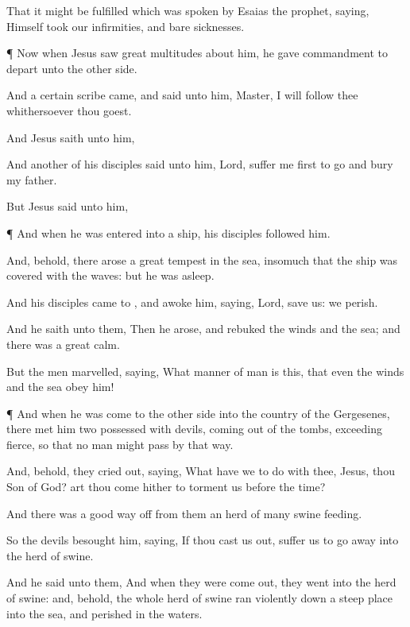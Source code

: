 {That it might be
fulfilled which was
spoken
by
Esaias the
prophet,
saying,
Himself
took
our
infirmities,
and
bare
{}
sicknesses.


\par }{\PP {}¶
Now
when
Jesus
saw
great
multitudes
about
him, he gave
commandment to
depart
unto the other
side.

And a
certain
scribe
came, and
said unto
him,
Master, I will
follow
thee
whithersoever thou
goest.

And
Jesus
saith unto
him,
{}

And
another
of
his
disciples
said unto
him,
Lord,
suffer
me
first to
go
and
bury
my
father.

But
Jesus
said unto
him,
{}


\par }{\PP {}¶
And
when
he was
entered
into a
ship,
his
disciples
followed
him.

And,
behold, there
arose a
great
tempest
in the
sea, insomuch
that the
ship was
covered
with the
waves:
but
he was
asleep.

And
his
disciples came
to
{}, and
awoke
him,
saying,
Lord,
save
us: we
perish.

And he
saith unto
them,
{}
Then he
arose, and
rebuked the
winds
and the
sea;
and there
was a
great
calm.

But the
men
marvelled,
saying, What manner of
man
is
this,
that
even the
winds
and the
sea
obey
him!


\par }{\PP {}¶
And
when
he was
come
to the other
side
into the
country of the
Gergesenes, there
met
him
two possessed with
devils, coming
out
of the
tombs,
exceeding
fierce, so
that
no
man
might
pass
by
that
way.

And,
behold, they cried
out,
saying,
What have
we to
do with
thee,
Jesus, thou
Son of
God? art thou
come
hither to
torment
us
before the
time?

And there
was a good way
off
from
them an
herd of
many
swine
feeding.

So the
devils
besought
him,
saying,
If thou
cast
us
out,
suffer
us to go
away
into the
herd of
swine.

And he
said unto
them,
{}
And when they were come
out, they
went
into the
herd of
swine:
and,
behold, the
whole
herd of
swine ran
violently
down a steep
place
into the
sea,
and
perished
in the
waters.

}
